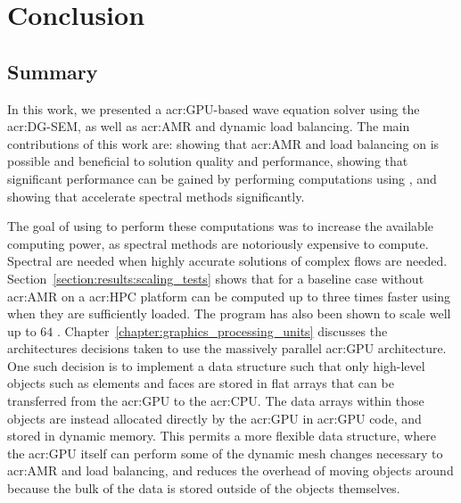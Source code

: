 \chapter{Conclusion}\label{chapter:conclusion}

\section{Summary}\label{section:conclusion:summary}

In this work, we presented a \acrshort{acr:GPU}-based wave equation solver using the
\acrlong{acr:DG-SEM}, as well as \acrlong{acr:AMR} and dynamic load balancing. The main
contributions of this work are: showing that \acrshort{acr:AMR} and load balancing on
 is possible and beneficial to solution quality and performance, showing that
significant performance can be gained by performing computations using , and
showing that  accelerate spectral methods significantly.

The goal of using  to perform these computations was to increase the available
computing power, as spectral methods are notoriously expensive to compute. Spectral are needed when
highly accurate solutions of complex flows are needed. Section~\ref{section:results:scaling_tests}
shows that for a baseline case without \acrshort{acr:AMR} on a \acrshort{acr:HPC} platform can be
computed up to three times faster using  when they are sufficiently loaded. The
program has also been shown to scale well up to \(64\) .
Chapter~\ref{chapter:graphics_processing_units} discusses the architectures decisions taken to use
the massively parallel \acrshort{acr:GPU} architecture. One such decision is to implement a data
structure such that only high-level objects such as elements and faces are stored in flat arrays
that can be transferred from the \acrshort{acr:GPU} to the \acrshort{acr:CPU}. The data arrays
within those objects are instead allocated directly by the \acrshort{acr:GPU} in \acrshort{acr:GPU}
code, and stored in dynamic memory. This permits a more flexible data structure, where the
\acrshort{acr:GPU} itself can perform some of the dynamic mesh changes necessary to
\acrshort{acr:AMR} and load balancing, and reduces the overhead of moving objects around because the
bulk of the data is stored outside of the objects themselves.

